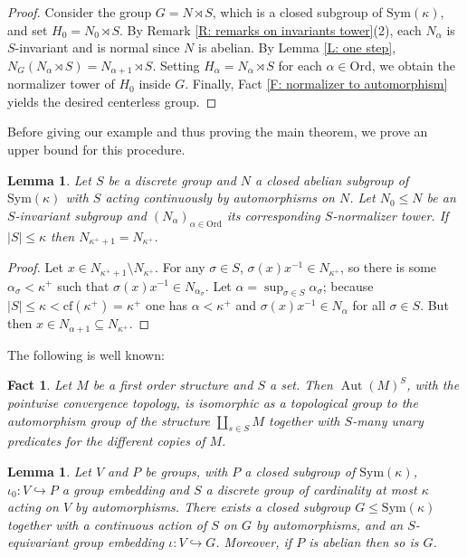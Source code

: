 \documentclass[10pt,a4paper]{amsart}
\theoremstyle{plain}
\newtheorem{lemma}[theorem]{Lemma}
\newtheorem{fact}[theorem]{Fact}
\theoremstyle{definition}
\newcounter{step}
\DeclareMathOperator{\aut}{Aut}
\begin{document}
\begin{proof}
    Consider the group $G=N\rtimes S$, which is a closed subgroup of $\mathrm{Sym}(\kappa)$, and set $H_0=N_0\rtimes S$. By Remark \ref{R: remarks on invariants tower}(2), each $N_\alpha$ is $S$-invariant and is normal since $N$ is abelian. By Lemma \ref{L: one step}, $N_G(N_\alpha\rtimes S)=N_{\alpha+1}\rtimes S$. Setting $H_\alpha=N_\alpha\rtimes S$ for each $\alpha\in \mathrm{Ord}$, we obtain the normalizer tower of $H_0$ inside $G$. Finally, Fact \ref{F: normalizer to automorphism} yields the desired  centerless group.
\end{proof}


Before giving our example and thus proving the main theorem, we prove an upper bound for this procedure.

\begin{lemma}\label{L:discrete-constant above omega1}
    Let $S$ be a discrete group and $N$ a closed abelian subgroup of $\mathrm{Sym}(\kappa)$ with $S$ acting continuously by automorphisms on $N$. Let $N_0\leq N$ be an  $S$-invariant subgroup and $( N_\alpha)_{\alpha\in \mathrm{Ord}}$ its corresponding  $S$-normalizer tower.    If $|S|\leq \kappa$ then $N_{\kappa^+ +1}=N_{\kappa^+}$.
\end{lemma}

\begin{proof}
   Let $x\in N_{\kappa^+ +1}\setminus N_{\kappa^+}$. For any $\sigma\in S$, $\sigma(x)x^{-1}\in N_{\kappa^+}$, so there is some $\alpha_\sigma<\kappa^+$ such that $\sigma(x)x^{-1}\in N_{\alpha_\sigma}$. Let $\alpha=\sup_{\sigma\in S} \alpha_{\sigma}$; because $|S|\leq \kappa<\mathrm{cf}(\kappa^+)=\kappa^+$ one has $\alpha<\kappa^+$ and $\sigma(x)x^{-1}\in N_\alpha$ for all $\sigma \in S$. But then $x\in N_{\alpha+1}\subseteq N_{\kappa^+}$.
\end{proof}



The following is well known:
\begin{fact}\label{F:power as first order}
    Let $M$ be a first order structure and $S$ a set. Then $\aut(M)^S$, with the pointwise convergence topology,  is isomorphic as a topological group to the automorphism group of the structure $\coprod_{s\in S}M$ together with $S$-many unary predicates for the different copies of $M$.
\end{fact}

\begin{lemma}\label{L:enlarge to polish}
    Let $V$ and $P$ be groups, with $P$ a closed subgroup of $\mathrm{Sym}(\kappa)$, $\iota_0:V\hookrightarrow P$ a group embedding and $S$ a discrete group of cardinality at most $\kappa$ acting on $V$ by automorphisms. There exists a closed subgroup $G\leq\mathrm{Sym}(\kappa)$ together with a \emph{continuous} action of $S$ on $G$ by automorphisms, and an $S$-equivariant group embedding $\iota: V\hookrightarrow G$. Moreover, if $P$ is abelian then so is $G$.
\end{lemma}
\end{document}
